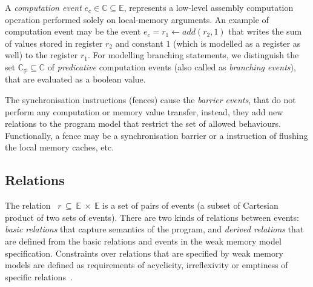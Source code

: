 A \textit{computation event} $e_c \in \mathbb{C} \subseteq \mathbb{E}$, represents a low-level assembly computation operation performed solely on local-memory arguments.
An example of computation event may be the event $e_c = r_1 \leftarrow add(r_2, 1)$ that writes the sum of values stored in register $r_2$ and constant $1$ (which is modelled as a register as well) to the register $r_1$.
For modelling branching statements, we distinguish the set $\mathbb{C_{p}} \subseteq \mathbb{C}$ of \textit{predicative} computation events (also called as \textit{branching events}), that are evaluated as a boolean value.

The synchronisation instructions (fences) cause the \textit{barrier events}, that do not perform any computation or memory value transfer, instead, they add new relations to the program model that restrict the set of allowed behaviours.
Functionally, a fence may be a synchronisation barrier or a instruction of flushing the local memory caches, etc.


\subsection{Relations}
\label{ch:wmm:model:relations}


The relation~%
$r\,\subseteq~\mathbb{E}~\times~\mathbb{E}$ is a set of pairs of events (a subset of Cartesian product of two sets of events). There are two kinds of relations between events: \textit{basic relations} %
that capture semantics of the program, and \textit{derived relations} that are defined from the basic relations and events in the weak memory model specification. Constraints over relations that are specified by weak memory models are defined as requirements of acyclicity, irreflexivity or emptiness of specific relations~\cite{alglave2016syntax}.

